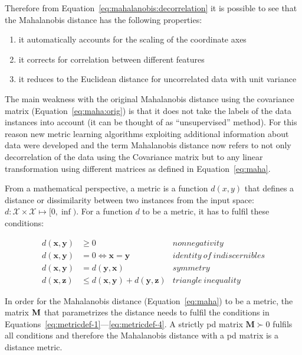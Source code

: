 Therefore from Equation~\ref{eq:mahalanobis:decorrelation} it is possible to see that the Mahalanobis distance has the following properties:
\begin{enumerate}
\item it automatically accounts for the scaling of the coordinate axes
\item it corrects for correlation between different features
\item it reduces to the Euclidean distance for uncorrelated data with unit variance
\end{enumerate}

The main weakness with the original Mahalanobis distance using the covariance matrix (Equation~\ref{eq:maha:orig}) is that it does not take the labels of the data instances into account (it can be thought of as ``unsupervised'' method). For this reason new metric learning algorithms exploiting additional information about data were developed and the term Mahalanobis distance now refers to not only decorrelation of the data using the Covariance matrix but to any linear transformation using different matrices as defined in Equation~\ref{eq:maha}.

From a mathematical perspective, a metric is a function $d(x,y)$ that defines a distance or dissimilarity between two instances from the input space: $d:\mathcal{X} \times \mathcal{X} \mapsto [0,\inf)$. For a function $d$ to be a metric, it has to fulfil these conditions:

\begin{align}
d(\textbf{x},\textbf{y}) &\geq 0 & nonnegativity \label{eq:metricdef-1} \\
d(\textbf{x},\textbf{y}) &= 0 \iff \textbf{x}=\textbf{y} & identity \ of \ indiscernibles \label{eq:metricdef-2} \\
d(\textbf{x},\textbf{y}) &= d(\textbf{y},\textbf{x}) & symmetry \label{eq:metricdef-3} \\
d(\textbf{x},\textbf{z}) &\leq d(\textbf{x},\textbf{y}) + d(\textbf{y},\textbf{z}) & triangle \ inequality \label{eq:metricdef-4}
\end{align} 

In order for the Mahalanobis distance (Equation~\ref{eq:maha}) to be a metric, the matrix $\bf{M}$ that parametrizes the distance needs to fulfil the conditions in Equations~\ref{eq:metricdef-1}---\ref{eq:metricdef-4}. A strictly \ac{pd} matrix $\bm{M} \succ 0$ fulfils all conditions and therefore the Mahalanobis distance with a \ac{pd} matrix is a distance metric.

